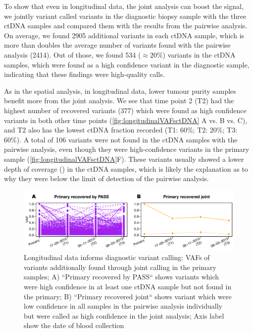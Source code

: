 To show that even in longitudinal data, the joint analysis can boost the signal, we jointly variant called variants in the diagnostic biopsy sample with the three ctDNA samples and compared them with the results from the pairwise analysis. On average, we found 2905 additional variants in each ctDNA sample, which is more than doubles the average number of variants found with the pairwise analysis (2414). Out of those, we found 534 ($\approx 20\%$) variants in the ctDNA samples, which were found as a high confidence variant in the diagnostic sample, indicating that these findings were high-quality calls. 

As in the spatial analysis, in longitudinal data, lower tumour purity samples benefit more from the joint analysis. We see that time point 2 (T2) had the highest number of recovered variants (377) which were found as high confidence variants in both other time points (\autoref{fig:longitudinalVAFsctDNA} A vs. B vs. C), and T2 also has the lowest ctDNA fraction recorded (T1: 60\%; T2: 20\%; T3: 60\%). A total of 106 variants were not found in the ctDNA samples with the pairwise analysis, even though they were high-confidence variants in the primary sample (\autoref{fig:longitudinalVAFsctDNA}F). These variants usually showed a lower depth of coverage () in the ctDNA samples, which is likely the explanation as to why they were below the limit of detection of the pairwise analysis. 

\begin{figure}[ht]
\centering
\includegraphics[width=.99\linewidth]{Figures/jointVariantCalling/longitudinalCA9primaryVafs.pdf}
\caption[Longitudinal data informs diagnostic variant calling]{Longitudinal data informs diagnostic variant calling: VAFs of variants additionally found through joint calling in the primary samples; A) ``Primary recovered by PASS`` shows variants which were high confidence in at least one ctDNA sample but not found in the primary; B) ``Primary recovered joint`` shows variant which were low confidence in all samples in the pairwise analysis individually but were called as high confidence in the joint analysis; Axis label show the date of blood collection}\label{fig:longitudinalVAFsprimary}
\end{figure}

